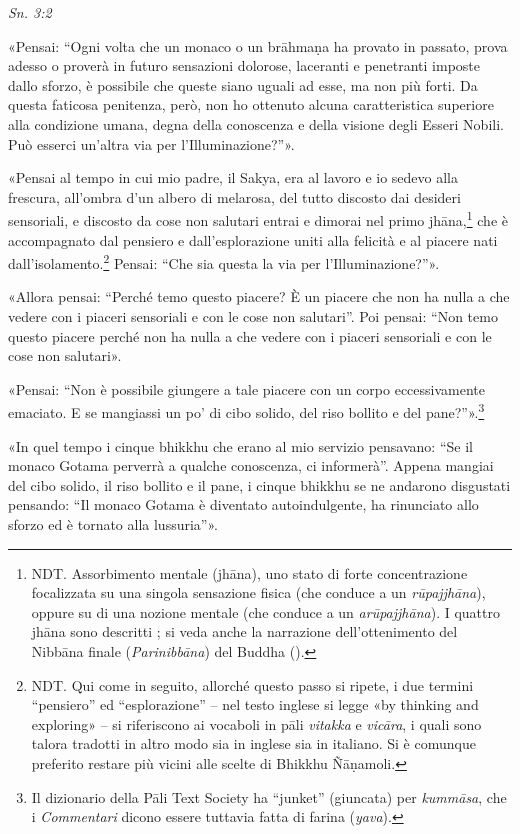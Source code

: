 \emph{Sn. 3:2}


«Pensai: “Ogni volta che un monaco o un brāhmaṇa ha provato in passato,
prova adesso o proverà in futuro sensazioni dolorose, laceranti e
penetranti imposte dallo sforzo, è possibile che queste siano uguali ad
esse, ma non più forti. Da questa faticosa penitenza, però, non ho
ottenuto alcuna caratteristica superiore alla condizione umana, degna
della conoscenza e della visione degli Esseri Nobili. Può esserci
un’altra via per l’Illuminazione?”».


«Pensai al tempo in cui mio padre, il Sakya, era al lavoro e io sedevo
alla frescura, all’ombra d’un albero di melarosa, del tutto discosto dai
desideri sensoriali, e discosto da cose non salutari entrai e dimorai
nel primo jhāna,\footnote{NDT. Assorbimento mentale (jhāna), uno stato di forte concentrazione focalizzata su una singola sensazione fisica (che conduce a un \emph{rūpajjhāna}), oppure su di una nozione mentale (che conduce a un \emph{arūpajjhāna}). I quattro jhāna sono descritti \hyperlink{pag27}{}; si veda anche la narrazione dell’ottenimento del Nibbāna finale (\emph{Parinibbāna}) del Buddha (\hyperlink{cap-15-L-ultimo-anno#pag364}{}).} che è accompagnato dal pensiero e
dall’esplorazione uniti alla felicità e al piacere nati
dall’isolamento.\footnote{NDT. Qui come in seguito, allorché questo passo si ripete, i due termini “pensiero” ed “esplorazione” – nel testo inglese si legge «by thinking and exploring» – si riferiscono ai vocaboli in pāli \emph{vitakka} e \emph{vicāra}, i quali sono talora tradotti in altro modo sia in inglese sia in italiano. Si è comunque preferito restare più vicini alle scelte di Bhikkhu Ñāṇamoli.} Pensai: “Che sia questa la via per
l’Illuminazione?”».


«Allora pensai: “Perché temo questo piacere? È un piacere che non ha
nulla a che vedere con i piaceri sensoriali e con le cose non salutari”.
Poi pensai: “Non temo questo piacere perché non ha nulla a che vedere
con i piaceri sensoriali e con le cose non salutari».


«Pensai: “Non è possibile giungere a tale piacere con un corpo
eccessivamente emaciato. E se mangiassi un po’ di cibo solido, del riso
bollito e del pane?”».\footnote{Il dizionario della Pāli Text Society ha “junket” (giuncata) per \emph{kummāsa}, che i \emph{Commentari} dicono essere tuttavia fatta di farina (\emph{yava}).}


«In quel tempo i cinque bhikkhu che erano al mio servizio pensavano: “Se
il monaco Gotama perverrà a qualche conoscenza, ci informerà”. Appena
mangiai del cibo solido, il riso bollito e il pane, i cinque bhikkhu se
ne andarono disgustati pensando: “Il monaco Gotama è diventato
autoindulgente, ha rinunciato allo sforzo ed è tornato alla lussuria”».


